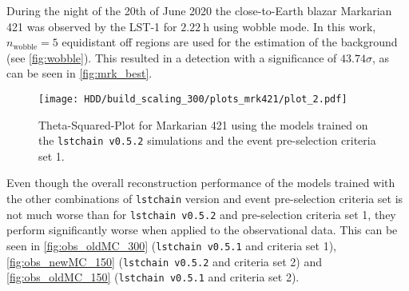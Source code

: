 During the night of the 20th of June 2020 the close-to-Earth blazar Markarian 421 was observed by the LST-1 for $\SI{2.22}{\hour}$ using wobble mode.
In this work, $n_\text{wobble} = \num{5}$ equidistant off regions are used for the estimation of the background (see \autoref{fig:wobble}).
This resulted in a detection with a significance of $\num{43.74} \sigma$, as can be seen in \autoref{fig:mrk_best}.
\begin{figure}
    \centering
    \texttt{[image: HDD/build\_scaling\_300/plots\_mrk421/plot\_2.pdf]}
    \caption{Theta-Squared-Plot for Markarian 421 using the models trained on the \texttt{lstchain v0.5.2} simulations and the event pre-selection criteria set 1.}
    \label{fig:mrk_best}
\end{figure}

Even though the overall reconstruction performance of the models trained with the other combinations of \texttt{lstchain} version and event pre-selection criteria set
is not much worse than for \texttt{lstchain v0.5.2} and pre-selection criteria set 1, they perform significantly worse when applied to the observational data.
This can be seen in \autoref{fig:obs_oldMC_300} (\texttt{lstchain v0.5.1} and criteria set 1), \autoref{fig:obs_newMC_150} (\texttt{lstchain v0.5.2} and criteria set 2)
and \autoref{fig:obs_oldMC_150} (\texttt{lstchain v0.5.1} and criteria set 2).
